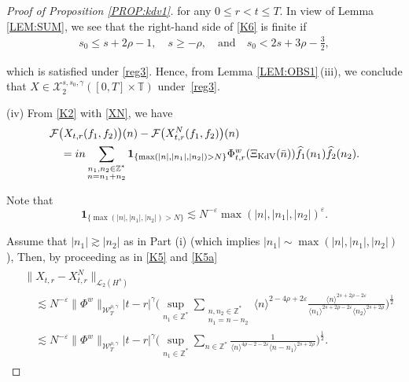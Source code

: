 \documentclass[letterpaper, 11pt,  reqno]{amsart}
\newcommand{\1}{\hspace{0.5mm}\text{I}\hspace{0.5mm}}
\newcommand{\noi}{\noindent}
\newcommand{\Z}{\mathbb{Z}}
\newcommand{\T}{\mathbb{T}}
\newcommand{\F}{\mathcal{F}}
\newcommand{\eps}{\varepsilon}
\newcommand{\g}{\gamma}
\newcommand{\ft}{\widehat}
\newcommand{\les}{\lesssim}
\newcommand{\ges}{\gtrsim}
\newcommand{\jb}[1]
{\langle #1 \rangle}
\newcommand{\ind}{\mathbf 1}
\newcommand{\cL}{\mathcal{L}}
\newcommand{\cX}{\mathcal{X}}
\newcommand{\W}{\mathcal{W}}
\newcommand{\KDV}{\text{\rm KdV} }
\numberwithin{equation}{section}
\numberwithin{theorem}{section}
\begin{document}
\begin{proof}[Proof of Proposition \ref{PROP:kdv1}]
\noi
for any $0 \le r <  t \le T$.
 In view of Lemma \ref{LEM:SUM}, 
we see that the right-hand side of \eqref{K6}
is finite if 
 \begin{align*}
s_0 \le s + 2\rho - 1, \quad s \ge - \rho, 
\quad \text{and}\quad 
s_0 < 2s + 3 \rho - \frac 32, 
 \end{align*}


\noi
which is satisfied under  \eqref{reg3}.
Hence,
from  Lemma \ref{LEM:OBS1}\,(iii),  
we conclude that 
 $X\in  \cX^{s,s_0,  \g}_2([0, T]\times \T)$ under~\eqref{reg3}.










\medskip

\noi
(iv)
From  \eqref{K2} with \eqref{XN}, we have 
\begin{align*}
& \F\big( X_{t,r}(f_1,f_2)\big)(n) - \F\big( X^N_{t,r}(f_1,f_2)\big)(n)\\
& \quad =in \sum_{ \substack{n_1, n_2 \in \Z^*\\n = n_1+n_2}}
 \ind_{\{\max(|n|, |n_1|, |n_2| )>  N\}}
\Phi^w_{t,r}(\Xi_\KDV(\bar n))
\ft f_1(n_1) \ft f_2(n_2).
\end{align*}


\noi
Note that 
\begin{equation}
 \ind_{\{\max(|n|, |n_1|, |n_2|) >  N\}} 
 \les N^{-\eps} 
\max(|n|, |n_1|, |n_2| )^{\eps}.
\label{K8}
\end{equation}

\noi
Assume
 that $|n_1|\ges |n_2|$ as in Part (i)
(which implies $|n_1| \sim \max(|n|, |n_1|, |n_2| )$), 
Then, by proceeding as in \eqref{K5} and \eqref{K5a}
\begin{align}
\begin{aligned}
& \|X_{t,r} - X^N_{t, r} \|_{\cL_2 (H^s)}\\
&\quad \les N^{-\eps}
 \| \Phi^w \|_{\W_T^{\rho,\g}} 
  |t-r|^{\g} 
\bigg(\sup_{n_1 \in \Z^*}
\sum_{\substack{n, n_2 \in \Z^*\\n_1 = n - n_2}} 
 \jb{n}^{2- 4\rho+2\eps}
 \frac{\jb{n}^{2s+2\rho-2\eps}}{\jb{n_1}^{2s+2\rho-2\eps} \jb{n_2}^{2s +2\rho}}\bigg)^\frac 12\\
&\quad \les N^{-\eps}
 \| \Phi^w \|_{\W_T^{\rho,\g}} 
  |t-r|^{\g} 
\bigg(\sup_{n_1 \in \Z^*}
\sum_{n\in \Z^*}
 \frac{1}{\jb{n}^{4\rho- 2-2\eps}\jb{n - n_1}^{2s +2\rho}}\bigg)^\frac 12.
 \label{K8a}
\end{aligned}
\end{align}


\end{proof}
\end{document}
